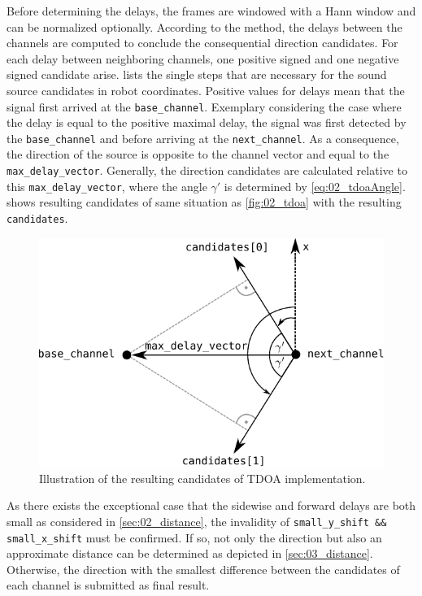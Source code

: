 Before determining the delays, the frames are windowed with a Hann window and can be
normalized optionally.
According to the method, the delays between the channels are computed to conclude the
consequential direction candidates.
For each delay between neighboring channels, one positive signed and one negative
signed candidate arise.
 lists the single steps that are necessary for the sound source
candidates in robot coordinates.
Positive values for delays mean that the signal first arrived at the \lstinline!base_channel!.
Exemplary considering the case where the delay is equal to the positive maximal delay,
the signal was first
detected by the \lstinline!base_channel! and before arriving at the \lstinline!next_channel!.
As a consequence, the direction of the source is opposite to the channel vector and equal
to the \lstinline!max_delay_vector!.
Generally, the direction candidates are calculated relative to this \lstinline!max_delay_vector!,
where the angle $\gamma'$ is determined by \cref{eq:02_tdoaAngle}.
 shows resulting candidates of same situation as \cref{fig:02_tdoa} with
the resulting \lstinline!candidates!.
\begin{figure}[ht]
	\centering
		\includegraphics[width=0.6\columnwidth]{figures/tdoa_code}
	\caption{Illustration of the resulting candidates of \ac{TDOA} implementation.}
	\label{fig:03_tdoaCode}
\end{figure}

As there exists the exceptional case that the sidewise and forward delays are both small
as considered in \cref{sec:02_distance}, the invalidity of
\lstinline!small_y_shift && small_x_shift! must be confirmed.
If so, not only the direction but also an approximate distance can be determined
as depicted in \cref{sec:03_distance}.
Otherwise, the direction with the smallest difference between the
candidates of each channel is submitted as final result.